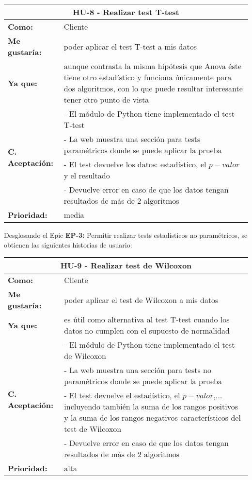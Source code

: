 \begin{table}[H]
	\begin{tabular}{| p{3cm}| p{12cm} |}
		\hline
		\multicolumn{2}{|c|}{\textbf{HU-8} - Realizar test T-test} \\ \hline
		\textbf{Como:} & Cliente \\ \hline
		\textbf{Me gustaría:} & poder aplicar el test T-test a mis datos \\ \hline
		\textbf{Ya que:} & aunque contrasta la misma hipótesis que Anova éste tiene otro estadístico y funciona únicamente para dos algoritmos, con lo que puede resultar interesante tener otro punto de vista \\ \hline
		\multirow{4}{12cm}{\textbf{C. Aceptación:}} & - El módulo de Python tiene implementado el test T-test \\
		& - La web muestra una sección para tests paramétricos donde se puede aplicar la prueba \\
		& - El test devuelve los datos: estadístico, el $p-valor$ y el resultado \\
		& - Devuelve error en caso de que los datos tengan resultados de más de 2 algoritmos \\ \hline
		\textbf{\textbf{Prioridad:}} & media \\ \hline
	\end{tabular}
\end{table}


Desglosando el Epic \textbf{EP-3:} Permitir realizar tests estadísticos no paramétricos, se obtienen las siguientes historias de usuario:

\begin{table}[H]
	\begin{tabular}{| p{3cm}| p{12cm} |}
		\hline
		\multicolumn{2}{|c|}{\textbf{HU-9} - Realizar test de Wilcoxon} \\ \hline
		\textbf{Como:} & Cliente \\ \hline
		\textbf{Me gustaría:} & poder aplicar el test de Wilcoxon a mis datos \\ \hline
		\textbf{Ya que:} & es útil como alternativa al test T-test cuando los datos no cumplen con el supuesto de normalidad \\ \hline
		\multirow{4}{12cm}{\textbf{C. Aceptación:}} & - El módulo de Python tiene implementado el test de Wilcoxon \\
		& - La web muestra una sección para tests no paramétricos donde se puede aplicar la prueba \\
		& - El test devuelve el estadístico, el $p-valor$,... incluyendo también la suma de los rangos positivos y la suma de los rangos negativos característicos del test de Wilcoxon \\
		& - Devuelve error en caso de que los datos tengan resultados de más de 2 algoritmos \\ \hline
		\textbf{\textbf{Prioridad:}} & alta \\ \hline
	\end{tabular}
\end{table}

